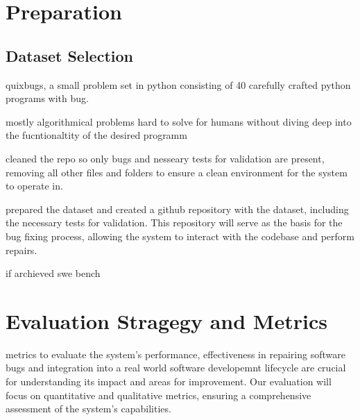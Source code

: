 \section{Preparation}
\subsection{Dataset Selection}
quixbugs, a small problem set in python \cite{linQuixBugsMultilingualProgram2017}
consisting of 40 carefully crafted python programs with bug.


mostly algorithmical problems hard to solve for humans without diving deep into the fucntionaltity of the desired programm


cleaned the repo so only bugs and nesseary tests for validation are present, removing all other files and folders to ensure a clean environment for the system to operate in.

prepared the dataset and created a github repository with the dataset, including the necessary tests for validation. This repository will serve as the basis for the bug fixing process, allowing the system to interact with the codebase and perform repairs.


if archieved swe bench \cite{jimenezSWEbenchCanLanguage2024}


\section{Evaluation Stragegy and Metrics}

metrics to evaluate the system's performance, effectiveness in repairing software bugs and integration into a real world software developemnt lifecycle are crucial for understanding its impact and areas for improvement. Our evaluation will focus on quantitative and qualitative metrics, ensuring a comprehensive assessment of the system's capabilities.

